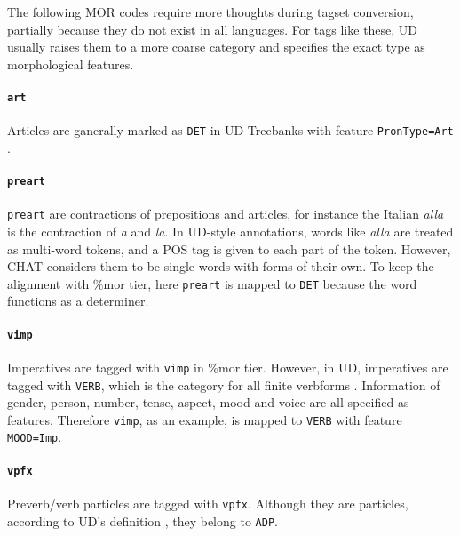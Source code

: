 The following MOR codes require more thoughts during tagset conversion, partially because they do not exist in all languages. For tags like these, UD usually raises them to a more coarse category and specifies the exact type as morphological features.

\paragraph{\texttt{art}}
Articles are ganerally marked as \texttt{DET} in UD Treebanks with feature \texttt{PronType=Art} .

\paragraph{\texttt{preart}}
\texttt{preart} are contractions of prepositions and articles, for instance the Italian \emph{alla} is the contraction of \emph{a} and \emph{la}. In UD-style annotations, words like \emph{alla} are treated as multi-word tokens, and a POS tag is given to each part of the token. However, CHAT considers them to be single words with forms of their own. To keep the alignment with \%mor tier, here \texttt{preart} is mapped to \texttt{DET} because the word functions as a determiner.

\paragraph{\texttt{vimp}}
Imperatives are tagged with \texttt{vimp} in \%mor tier. However, in UD, imperatives are tagged with \texttt{VERB}, which is the category for all finite verbforms  . Information of gender, person, number, tense, aspect, mood and voice are all specified as features. Therefore \texttt{vimp}, as an example, is mapped to \texttt{VERB} with feature \texttt{MOOD=Imp}.

\paragraph{\texttt{vpfx}}
Preverb/verb particles are tagged with \texttt{vpfx}. Although they are particles, according to UD's definition , they belong to \texttt{ADP}.

